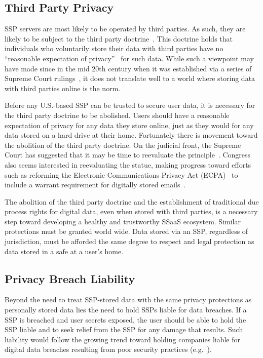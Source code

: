 \subsection{Third Party Privacy}

SSP servers are most likely to be operated by third parties. As such,
they are likely to be subject to the third party
doctrine~\cite{thompson-thirdparty}. This doctrine holds that
individuals who voluntarily store their data with third parties have
no ``reasonable expectation of privacy''~\cite{scotus-katzvus} for
such data. While such a viewpoint may have made since in the mid 20th
century when it was established via a series of Supreme Court
rulings~\cite{scotus-usvmiller-privacy, scotus-smithvmaryland}, it
does not translate well to a world where storing data with third
parties online is the norm.

Before any U.S.-based SSP can be trusted to secure user data, it is
necessary for the third party doctrine to be abolished. Users should
have a reasonable expectation of privacy for any data they store
online, just as they would for any data stored on a hard drive at
their home. Fortunately there is movement toward the abolition of the
third party doctrine. On the judicial front, the Supreme Court has
suggested that it may be time to reevaluate the
principle~\cite{scotus-usvjones}. Congress also seems interested in
reevaluating the statue, making progress toward efforts such as
reforming the Electronic Communications Privacy Act (ECPA)~\cite{ecpa}
to include a warrant requirement for digitally stored
emails~\cite{eff-ecpareform}.

The abolition of the third party doctrine and the establishment of
traditional due process rights for digital data, even when stored with
third parties, is a necessary step toward developing a healthy and
trustworthy SSaaS ecosystem. Similar protections must be granted world
wide. Data stored via an SSP, regardless of jurisdiction, must be
afforded the same degree to respect and legal protection as data
stored in a safe at a user's home.

\subsection{Privacy Breach Liability}
\label{chap:policy:trustworthiness:liability}

Beyond the need to treat SSP-stored data with the same privacy
protections as personally stored data lies the need to hold SSPs
liable for data breaches. If a SSP is breached and user secrets
exposed, the user should be able to hold the SSP liable and to seek
relief from the SSP for any damage that results. Such liability would
follow the growing trend toward holding companies liable for digital
data breaches resulting from poor security practices
(e.g.~\cite{ftc-asus}).

